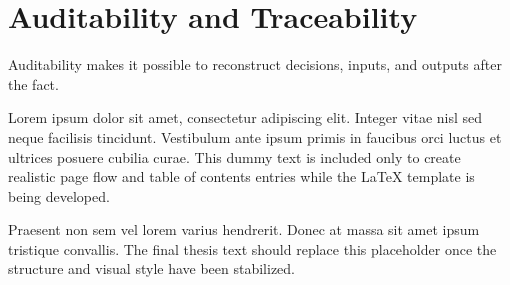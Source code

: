 \section{Auditability and Traceability}

Auditability makes it possible to reconstruct decisions, inputs, and outputs after the fact.

Lorem ipsum dolor sit amet, consectetur adipiscing elit. Integer vitae nisl sed neque facilisis tincidunt. Vestibulum ante ipsum primis in faucibus orci luctus et ultrices posuere cubilia curae. This dummy text is included only to create realistic page flow and table of contents entries while the LaTeX template is being developed.

Praesent non sem vel lorem varius hendrerit. Donec at massa sit amet ipsum tristique convallis. The final thesis text should replace this placeholder once the structure and visual style have been stabilized.

